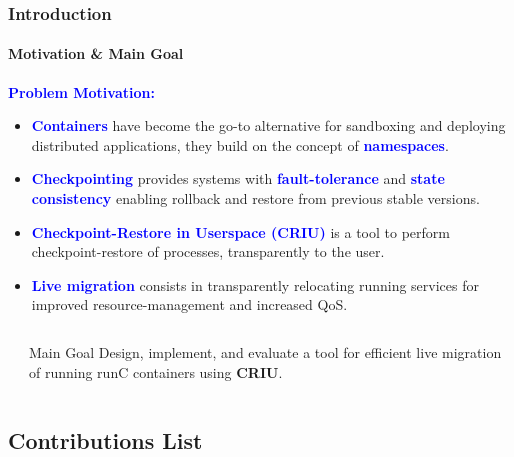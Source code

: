 \documentclass[9pt,    %
    english,            %
    xcolor=table,       %
    envcountsect,        %
    aspectratio=169     %
]{beamer}
\begin{document}
\begin{frame}
    \frametitle{Introduction}
    \framesubtitle{Motivation \& Main Goal}

    \textbf{\textcolor{blue}{Problem Motivation:}}
    \begin{itemize}
        \item \textbf{\textcolor{blue}{Containers}} have become the go-to alternative for sandboxing and deploying distributed applications, they build on the concept of \textbf{\textcolor{blue}{namespaces}}.
        \item \textbf{\textcolor{blue}{Checkpointing}} provides systems with \textbf{\textcolor{blue}{fault-tolerance}} and \textbf{\textcolor{blue}{state consistency}} enabling rollback and restore from previous stable versions.
        \item \textbf{\textcolor{blue}{Checkpoint-Restore in Userspace (CRIU)}} is a tool to perform checkpoint-restore of processes, transparently to the user.
        \item \textbf{\textcolor{blue}{Live migration}} consists in transparently relocating running services for improved resource-management and increased QoS.
    \end{itemize}

    \begin{columns}
        \begin{column}{.1\textwidth}
        \end{column}\hspace{-5cm}
        \begin{column}{.7\textwidth}
            \begin{alertblock}{Main Goal}
                Design, implement, and evaluate a tool for efficient live migration of running runC containers using \textbf{CRIU}.
            \end{alertblock}\hfill
        \end{column}
    \end{columns}

\end{frame}

\subsection{Contributions List}
\end{document}
